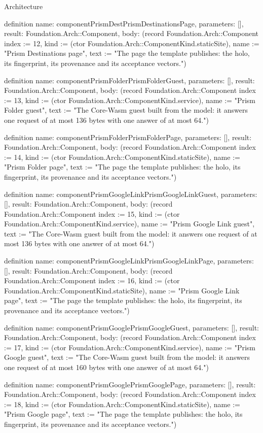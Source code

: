 \begin{lexlean}{Architecture}
\begin{semanticmodule}
definition{
  name: componentPrismDestPrismDestinationsPage,
  parameters: [],
  result: Foundation.Arch::Component,
  body: (record Foundation.Arch::Component {index := 12, kind := (ctor Foundation.Arch::ComponentKind.staticSite), name := "Prism Destinations page", text := "The page the template publishes: the holo, its fingerprint, its provenance and its acceptance vectors."})
}

definition{
  name: componentPrismFolderPrismFolderGuest,
  parameters: [],
  result: Foundation.Arch::Component,
  body: (record Foundation.Arch::Component {index := 13, kind := (ctor Foundation.Arch::ComponentKind.service), name := "Prism Folder guest", text := "The Core-Wasm guest built from the model: it answers one request of at most 136 bytes with one answer of at most 64."})
}

definition{
  name: componentPrismFolderPrismFolderPage,
  parameters: [],
  result: Foundation.Arch::Component,
  body: (record Foundation.Arch::Component {index := 14, kind := (ctor Foundation.Arch::ComponentKind.staticSite), name := "Prism Folder page", text := "The page the template publishes: the holo, its fingerprint, its provenance and its acceptance vectors."})
}

definition{
  name: componentPrismGoogleLinkPrismGoogleLinkGuest,
  parameters: [],
  result: Foundation.Arch::Component,
  body: (record Foundation.Arch::Component {index := 15, kind := (ctor Foundation.Arch::ComponentKind.service), name := "Prism Google Link guest", text := "The Core-Wasm guest built from the model: it answers one request of at most 136 bytes with one answer of at most 64."})
}

definition{
  name: componentPrismGoogleLinkPrismGoogleLinkPage,
  parameters: [],
  result: Foundation.Arch::Component,
  body: (record Foundation.Arch::Component {index := 16, kind := (ctor Foundation.Arch::ComponentKind.staticSite), name := "Prism Google Link page", text := "The page the template publishes: the holo, its fingerprint, its provenance and its acceptance vectors."})
}

definition{
  name: componentPrismGooglePrismGoogleGuest,
  parameters: [],
  result: Foundation.Arch::Component,
  body: (record Foundation.Arch::Component {index := 17, kind := (ctor Foundation.Arch::ComponentKind.service), name := "Prism Google guest", text := "The Core-Wasm guest built from the model: it answers one request of at most 160 bytes with one answer of at most 64."})
}

definition{
  name: componentPrismGooglePrismGooglePage,
  parameters: [],
  result: Foundation.Arch::Component,
  body: (record Foundation.Arch::Component {index := 18, kind := (ctor Foundation.Arch::ComponentKind.staticSite), name := "Prism Google page", text := "The page the template publishes: the holo, its fingerprint, its provenance and its acceptance vectors."})
}


\end{semanticmodule}
\end{lexlean}
